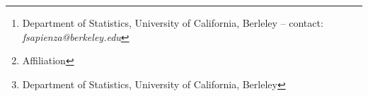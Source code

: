 
\author{ 
    Facundo Sapienza
    \thanks{Department of Statistics, University of California, Berleley -- contact: \textit{fsapienza@berkeley.edu}}, 
    Jordi Bolibar
    \thanks{Affiliation},
    Fernando Pérez
    \thanks{Department of Statistics, University of California, Berleley}
}
